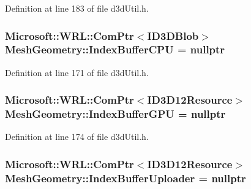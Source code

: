 Definition at line 183 of file d3d\+Util.\+h.

\subsubsection[{\texorpdfstring{Index\+Buffer\+C\+PU}{IndexBufferCPU}}]{\setlength{\rightskip}{0pt plus 5cm}Microsoft\+::\+W\+R\+L\+::\+Com\+Ptr$<$I\+D3\+D\+Blob$>$ Mesh\+Geometry\+::\+Index\+Buffer\+C\+PU = nullptr}\hypertarget{struct_mesh_geometry_aa9a4e934b370f9c716217b01c15bad32_aa9a4e934b370f9c716217b01c15bad32}{}\label{struct_mesh_geometry_aa9a4e934b370f9c716217b01c15bad32_aa9a4e934b370f9c716217b01c15bad32}


Definition at line 171 of file d3d\+Util.\+h.

\subsubsection[{\texorpdfstring{Index\+Buffer\+G\+PU}{IndexBufferGPU}}]{\setlength{\rightskip}{0pt plus 5cm}Microsoft\+::\+W\+R\+L\+::\+Com\+Ptr$<$I\+D3\+D12\+Resource$>$ Mesh\+Geometry\+::\+Index\+Buffer\+G\+PU = nullptr}\hypertarget{struct_mesh_geometry_a98d981b7fd0627dbe53c31ce83d23d8f_a98d981b7fd0627dbe53c31ce83d23d8f}{}\label{struct_mesh_geometry_a98d981b7fd0627dbe53c31ce83d23d8f_a98d981b7fd0627dbe53c31ce83d23d8f}


Definition at line 174 of file d3d\+Util.\+h.

\subsubsection[{\texorpdfstring{Index\+Buffer\+Uploader}{IndexBufferUploader}}]{\setlength{\rightskip}{0pt plus 5cm}Microsoft\+::\+W\+R\+L\+::\+Com\+Ptr$<$I\+D3\+D12\+Resource$>$ Mesh\+Geometry\+::\+Index\+Buffer\+Uploader = nullptr}\hypertarget{struct_mesh_geometry_a49a2735dd265091e5451c26c7e4fceb9_a49a2735dd265091e5451c26c7e4fceb9}{}\label{struct_mesh_geometry_a49a2735dd265091e5451c26c7e4fceb9_a49a2735dd265091e5451c26c7e4fceb9}



